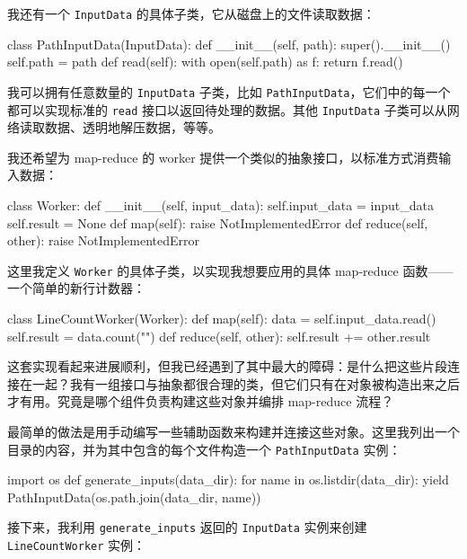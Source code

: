我还有一个 \texttt{InputData} 的具体子类，它从磁盘上的文件读取数据：

\begin{codebox}[python]
class PathInputData(InputData):
    def __init__(self, path):
        super().__init__()
        self.path = path
    def read(self):
        with open(self.path) as f:
            return f.read()
\end{codebox}

我可以拥有任意数量的 \texttt{InputData} 子类，比如 \texttt{PathInputData}，它们中的每一个都可以实现标准的 \texttt{read} 接口以返回待处理的数据。其他 \texttt{InputData} 子类可以从网络读取数据、透明地解压数据，等等。

我还希望为 map-reduce 的 worker 提供一个类似的抽象接口，以标准方式消费输入数据：

\begin{codebox}[python]
class Worker:
    def __init__(self, input_data):
        self.input_data = input_data
        self.result = None
    def map(self):
        raise NotImplementedError
    def reduce(self, other):
        raise NotImplementedError
\end{codebox}

这里我定义 \texttt{Worker} 的具体子类，以实现我想要应用的具体 map-reduce 函数——一个简单的新行计数器：

\begin{codebox}[python]
class LineCountWorker(Worker):
    def map(self):
        data = self.input_data.read()
        self.result = data.count("\n")
    def reduce(self, other):
        self.result += other.result
\end{codebox}

这套实现看起来进展顺利，但我已经遇到了其中最大的障碍：是什么把这些片段连接在一起？我有一组接口与抽象都很合理的类，但它们只有在对象被构造出来之后才有用。究竟是哪个组件负责构建这些对象并编排 map-reduce 流程？

最简单的做法是用手动编写一些辅助函数来构建并连接这些对象。这里我列出一个目录的内容，并为其中包含的每个文件构造一个 \texttt{PathInputData} 实例：

\begin{codebox}[python]
import os
def generate_inputs(data_dir):
    for name in os.listdir(data_dir):
        yield PathInputData(os.path.join(data_dir, name))
\end{codebox}

接下来，我利用 \texttt{generate\_inputs} 返回的 \texttt{InputData} 实例来创建 \texttt{LineCountWorker} 实例：

